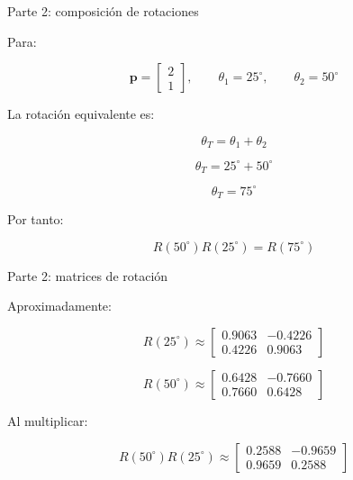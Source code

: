 \documentclass[aspectratio=169]{beamer}
\begin{document}
\begin{frame}{Parte 2: composición de rotaciones}

    Para:

    \[
    \mathbf{p}
    =
    \begin{bmatrix}
        2\\
        1
    \end{bmatrix},
    \qquad
    \theta_1=25^\circ,
    \qquad
    \theta_2=50^\circ
    \]

    La rotación equivalente es:

    \[
    \theta_T=\theta_1+\theta_2
    \]

    \[
    \theta_T=25^\circ+50^\circ
    \]

    \[
    \boxed{\theta_T=75^\circ}
    \]

    Por tanto:

    \[
    R(50^\circ)R(25^\circ)=R(75^\circ)
    \]

\end{frame}

\begin{frame}{Parte 2: matrices de rotación}

    Aproximadamente:

    \[
    R(25^\circ)
    \approx
    \begin{bmatrix}
        0.9063 & -0.4226\\
        0.4226 & 0.9063
    \end{bmatrix}
    \]

    \[
    R(50^\circ)
    \approx
    \begin{bmatrix}
        0.6428 & -0.7660\\
        0.7660 & 0.6428
    \end{bmatrix}
    \]

    Al multiplicar:

    \[
    R(50^\circ)R(25^\circ)
    \approx
    \begin{bmatrix}
        0.2588 & -0.9659\\
        0.9659 & 0.2588
    \end{bmatrix}
    \]

\end{frame}
\end{document}
